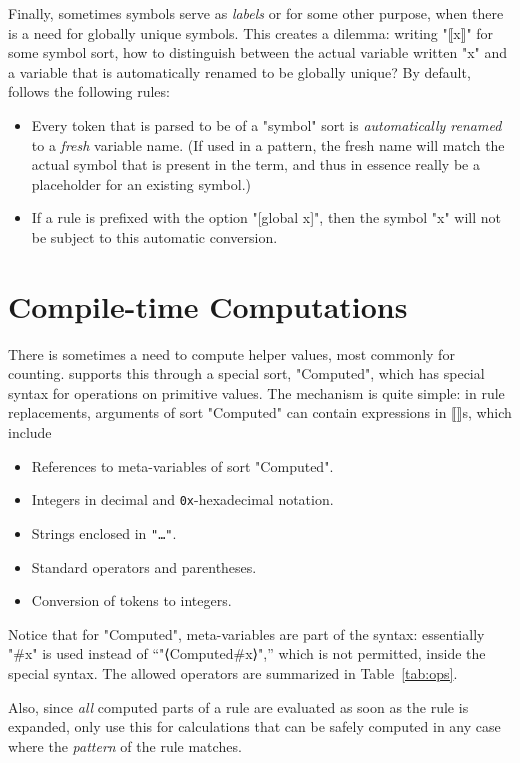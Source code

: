 \documentclass[11pt]{article} %
\begin{document}
Finally, sometimes symbols serve as \emph{labels} or for some other purpose, when there is a need
for globally unique symbols. This creates a dilemma: writing "⟦x⟧" for some symbol sort, how to
distinguish between the actual variable written "x" and a variable that is automatically renamed to
be globally unique? By default, \HAX follows the following rules:
\begin{itemize}

\item Every token that is parsed to be of a "symbol" sort is \emph{automatically renamed} to a
  \emph{fresh} variable name. (If used in a pattern, the fresh name will match the actual symbol
  that is present in the term, and thus in essence really be a placeholder for an existing symbol.)

\item If a rule is prefixed with the option "[global x]", then the symbol "x" will not be subject to
  this automatic conversion.

\end{itemize}


\section{Compile-time Computations}
\label{sec:comp}

There is sometimes a need to compute helper values, most commonly for counting. \HAX supports this
through a special sort, "Computed", which has special syntax for operations on primitive values.
The mechanism is quite simple: in rule replacements, arguments of sort "Computed" can contain
expressions in ⟦⟧s, which include
\begin{itemize}
\item References to meta-variables of sort "Computed".
\item Integers in decimal and \texttt{0x}-hexadecimal notation.
\item Strings enclosed in \texttt{"…"}.
\item Standard operators and parentheses.
\item Conversion of tokens to integers.
\end{itemize}
Notice that for "Computed", meta-variables are part of the syntax: essentially "#x" is used instead
of ``"⟨Computed#x⟩",'' which is not permitted, inside the special syntax.  The allowed operators are
summarized in Table~\ref{tab:ops}.

Also, since \emph{all} computed parts of a rule are evaluated as soon as the rule is expanded, only
use this for calculations that can be safely computed in any case where the \emph{pattern} of the
rule matches.
\end{document}
